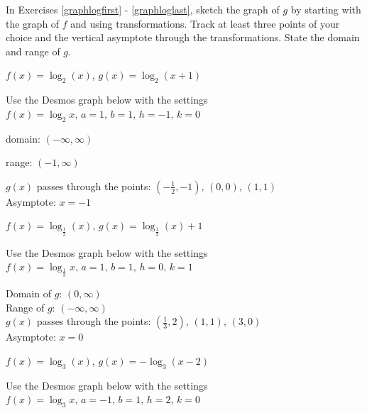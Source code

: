 \documentclass{ximera}
\begin{document}
\begin{question}
In Exercises \ref{graphlogfirst} - \ref{graphloglast}, sketch the graph of $g$ by starting with the graph of $f$ and using transformations.  Track at least three points of your choice and the vertical asymptote through the transformations. State the domain and range of $g$.

\begin{problem}\label{graphlogfirst}
$f(x) = \log_{2}(x)$, $g(x) = \log_{2}(x+1)$ 

\begin{solution}
Use the Desmos graph below with the settings $f(x)=\log_2 x,\,a=1,\,b=1,\,h=-1,\,k=0$

\begin{center} 
\end{center}

domain: $(-\infty, \infty)$

range: $(-1, \infty)$

 $g(x)$ passes through the points:  $\left( -\frac{1}{2}, -1 \right)$, $(0,0)$, $(1,1)$\\
 Asymptote: $x = -1$ \\
\end{solution}
\end{problem}

\begin{problem}
$f(x) = \log_{\frac{1}{3}}(x)$, $g(x) = \log_{\frac{1}{3}}(x)+1$

\begin{solution}
Use the Desmos graph below with the settings $f(x)=\log_\frac{1}{3} x,\,a=1,\,b=1,\,h=0,\,k=1$

\begin{center} 
\end{center}

Domain of $g$:  $(0, \infty)$\\
 Range of $g$:  $(-\infty, \infty)$ \\
 $g(x)$ passes through the points:  $\left(\frac{1}{3}, 2 \right)$, $(1,1)$, $(3,0)$ \\
 Asymptote: $x = 0$ \\
\end{solution}
\end{problem}

\begin{problem}
$f(x) = \log_{3}(x)$, $g(x) = -\log_{3}(x-2)$

\begin{solution}
Use the Desmos graph below with the settings $f(x)=\log_{3}x,\,a=-1,\,b=1,\,h=2,\,k=0$


\end{solution}
\end{problem}
\end{question}
\end{document}

